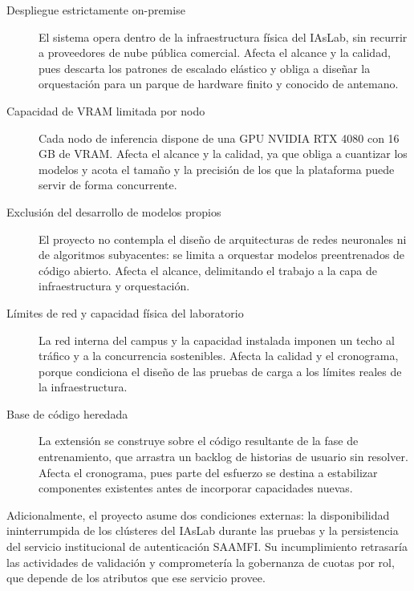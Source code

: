\begin{description}
  \item[Despliegue estrictamente on-premise] El sistema opera dentro de la infraestructura física del IAsLab, sin recurrir a proveedores de nube pública comercial. Afecta el alcance y la calidad, pues descarta los patrones de escalado elástico y obliga a diseñar la orquestación para un parque de hardware finito y conocido de antemano.
  \item[Capacidad de VRAM limitada por nodo] Cada nodo de inferencia dispone de una GPU NVIDIA RTX 4080 con 16 GB de VRAM. Afecta el alcance y la calidad, ya que obliga a cuantizar los modelos y acota el tamaño y la precisión de los que la plataforma puede servir de forma concurrente.
  \item[Exclusión del desarrollo de modelos propios] El proyecto no contempla el diseño de arquitecturas de redes neuronales ni de algoritmos subyacentes: se limita a orquestar modelos preentrenados de código abierto. Afecta el alcance, delimitando el trabajo a la capa de infraestructura y orquestación.
  \item[Límites de red y capacidad física del laboratorio] La red interna del campus y la capacidad instalada imponen un techo al tráfico y a la concurrencia sostenibles. Afecta la calidad y el cronograma, porque condiciona el diseño de las pruebas de carga a los límites reales de la infraestructura.
  \item[Base de código heredada] La extensión se construye sobre el código resultante de la fase de entrenamiento, que arrastra un backlog de historias de usuario sin resolver. Afecta el cronograma, pues parte del esfuerzo se destina a estabilizar componentes existentes antes de incorporar capacidades nuevas.
\end{description}


Adicionalmente, el proyecto asume dos condiciones externas: la disponibilidad ininterrumpida de los clústeres del IAsLab durante las pruebas y la persistencia del servicio institucional de autenticación SAAMFI. Su incumplimiento retrasaría las actividades de validación y comprometería la gobernanza de cuotas por rol, que depende de los atributos que ese servicio provee.
